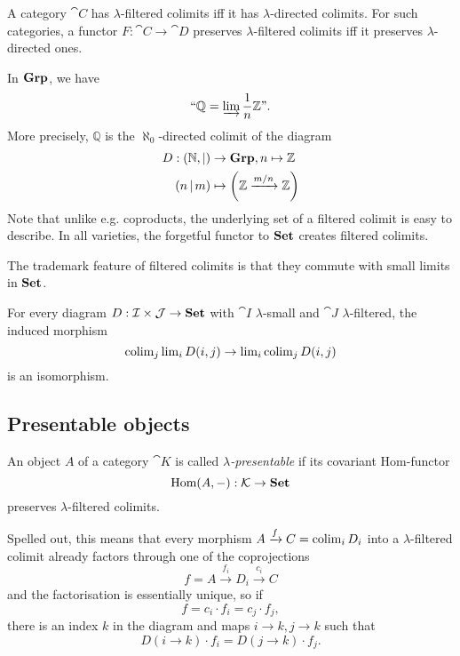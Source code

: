 \begin{Proposition}A category $\cat C$ has $\lambda$-filtered colimits iff it has $\lambda$-directed colimits. For such categories, a functor $F : \cat C \to \cat D$ preserves $\lambda$-filtered colimits iff it preserves $\lambda$-directed ones.
\end{Proposition}

\begin{Example}\label{ex:Q}
In $\mathbf{Grp}$, we have 
\[ \text{``}\mathbb Q = \varinjlim \frac 1 n \mathbb Z\text{''}. \]
More precisely, $\mathbb Q$ is the $\aleph_0$-directed colimit of the diagram
\begin{align*}
 D : (\mathbb N, |) &\to \mathbf{Grp}, n \mapsto \mathbb Z \\
 (n\, | \,m) &\mapsto \left(\mathbb Z \xrightarrow{m/n} \mathbb Z\right)
\end{align*}
Note that unlike e.g. coproducts, the underlying set of a filtered colimit is easy to describe. In all varieties, the forgetful functor to $\mathbf{Set}$ creates filtered colimits.
\end{Example}

The trademark feature of filtered colimits is that they commute with small limits in $\mathbf{Set}$.

\begin{Lemma}\label{prop:smallvsfiltered}
For every diagram $D : \mathcal{I} \times \mathcal{J} \to \mathbf{Set}$ with $\cat I$ $\lambda$-small and $\cat J$ $\lambda$-filtered, the induced morphism
\[ \operatorname{colim}_j \operatorname{lim}_i D(i,j) \to \operatorname{lim}_i \operatorname{colim}_j D(i,j) \]
is an isomorphism.
\end{Lemma}

\subsection{Presentable objects}
\begin{Definition}
An object $A$ of a category $\cat K$ is called \emph{$\lambda$-presentable} if its covariant Hom-functor 
\[ \textrm{Hom}(A,-) : \mathcal{K} \to \mathbf{Set} \]
preserves $\lambda$-filtered colimits.
\end{Definition}
Spelled out, this means that every morphism $A \xrightarrow{f} C = \operatorname{colim}_i D_i$ into a $\lambda$-filtered colimit already factors through one of the coprojections
\[ f = A \xrightarrow{f_i} D_i \xrightarrow{c_i} C \]
and the factorisation is essentially unique, so if \[ f = c_i\cdot f_i = c_j \cdot f_j, \]
there is an index $k$ in the diagram and maps $i \to k, j \to k$ such that
\[ D(i \to k)\cdot f_i = D(j \to k) \cdot f_j. \]

